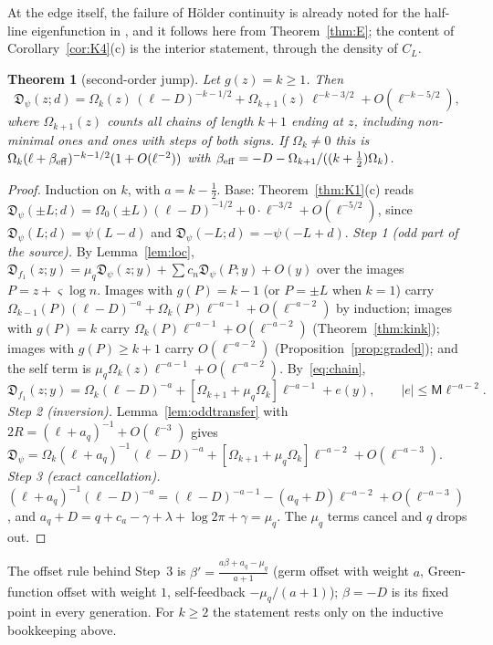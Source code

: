 \documentclass[11pt]{amsart}
\newcommand{\Dj}{\mathfrak{D}}
\newtheorem{theorem}{Theorem}[section]
\theoremstyle{definition}
\theoremstyle{remark}
\numberwithin{equation}{section}
\begin{document}
At the edge itself, the failure of H\"older continuity is already noted for the half-line eigenfunction in \cite[Ex.~6.4]{Kw11}, and it follows here from Theorem~\ref{thm:E}; the content of Corollary~\ref{cor:K4}(c) is the interior statement, through the density of $C_L$.

\begin{theorem}[second-order jump]\label{thm:K5}
Let $g(z)=k\ge1$. Then
\[
\Dj_\psi(z;d)=\Omega_k(z)\,(\ell-D)^{-k-1/2}+\Omega_{k+1}(z)\,\ell^{-k-3/2}+O(\ell^{-k-5/2}),
\]
where $\Omega_{k+1}(z)$ counts all chains of length $k+1$ ending at $z$, including non-minimal ones and ones with steps of both signs. If $\Omega_k\ne0$ this is $\Omega_k(\ell+\beta_{\rm eff})^{-k-1/2}(1+O(\ell^{-2}))$ with $\beta_{\rm eff}=-D-\Omega_{k+1}/((k+\frac12)\Omega_k)$.
\end{theorem}

\begin{proof}
Induction on $k$, with $a=k-\frac12$. Base: Theorem~\ref{thm:K1}(c) reads $\Dj_\psi(\pm L;d)=\Omega_0(\pm L)(\ell-D)^{-1/2}+0\cdot\ell^{-3/2}+O(\ell^{-5/2})$, since $\Dj_\psi(L;d)=\psi(L-d)$ and $\Dj_\psi(-L;d)=-\psi(-L+d)$.
\emph{Step 1 (odd part of the source).} By Lemma~\ref{lem:loc}, $\Dj_{f_1}(z;y)=\mu_q\Dj_\psi(z;y)+\sum c_n\Dj_\psi(P;y)+O(y)$ over the images $P=z+\varsigma\log n$. Images with $g(P)=k-1$ (or $P=\pm L$ when $k=1$) carry $\Omega_{k-1}(P)(\ell-D)^{-a}+\Omega_k(P)\ell^{-a-1}+O(\ell^{-a-2})$ by induction; images with $g(P)=k$ carry $\Omega_k(P)\ell^{-a-1}+O(\ell^{-a-2})$ (Theorem~\ref{thm:kink}); images with $g(P)\ge k+1$ carry $O(\ell^{-a-2})$ (Proposition~\ref{prop:graded}); and the self term is $\mu_q\Omega_k(z)\ell^{-a-1}+O(\ell^{-a-2})$. By~\eqref{eq:chain},
\[
\Dj_{f_1}(z;y)=\Omega_k(\ell-D)^{-a}+[\Omega_{k+1}+\mu_q\Omega_k]\ell^{-a-1}+e(y),\qquad|e|\le \mathsf M\ell^{-a-2}.
\]
\emph{Step 2 (inversion).} Lemma~\ref{lem:oddtransfer} with $2R=(\ell+a_q)^{-1}+O(\ell^{-3})$ gives
$\Dj_\psi=\Omega_k(\ell+a_q)^{-1}(\ell-D)^{-a}+[\Omega_{k+1}+\mu_q\Omega_k]\ell^{-a-2}+O(\ell^{-a-3})$.
\emph{Step 3 (exact cancellation).} $(\ell+a_q)^{-1}(\ell-D)^{-a}=(\ell-D)^{-a-1}-(a_q+D)\ell^{-a-2}+O(\ell^{-a-3})$, and $a_q+D=q+c_a-\gamma+\lambda+\log2\pi+\gamma=\mu_q$. The $\mu_q$ terms cancel and $q$ drops out.
\end{proof}

The offset rule behind Step~3 is $\beta'=\frac{a\beta+a_q-\mu_q}{a+1}$ (germ offset with weight $a$, Green-function offset with weight $1$, self-feedback $-\mu_q/(a+1)$); $\beta=-D$ is its fixed point in every generation. For $k\ge2$ the statement rests only on the inductive bookkeeping above.
\end{document}
